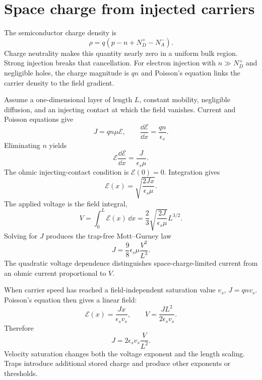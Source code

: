 \section{Space charge from injected carriers}

The semiconductor charge density is
\begin{equation}
  \rho=q(p-n+N_D^+-N_A^-).
  \label{eq:semiconductor-space-charge-density}
\end{equation}
Charge neutrality makes this quantity nearly zero in a uniform bulk region.
Strong injection breaks that cancellation.  For electron injection with
$n\gg N_D^+$ and negligible holes, the charge magnitude is $qn$ and Poisson's
equation links the carrier density to the field gradient.

Assume a one-dimensional layer of length $L$, constant mobility, negligible
diffusion, and an injecting contact at which the field vanishes.  Current and
Poisson equations give
\begin{equation}
  J=qn\mu\mathcal E,
  \qquad
  \frac{\dd\mathcal E}{\dd x}=\frac{qn}{\epsilon_s}.
  \label{eq:sclc-current-poisson}
\end{equation}
Eliminating $n$ yields
\begin{equation}
  \mathcal E\frac{\dd\mathcal E}{\dd x}
  =\frac{J}{\epsilon_s\mu}.
  \label{eq:sclc-field-equation}
\end{equation}
The ohmic injecting-contact condition is $\mathcal E(0)=0$.  Integration gives
\begin{equation}
  \mathcal E(x)
  =\sqrt{\frac{2Jx}{\epsilon_s\mu}}.
  \label{eq:mott-gurney-field-profile}
\end{equation}
The applied voltage is the field integral,
\begin{equation}
  V=\int_0^L\mathcal E(x)\,\dd x
  =\frac23\sqrt{\frac{2J}{\epsilon_s\mu}}L^{3/2}.
  \label{eq:mott-gurney-voltage-integral}
\end{equation}
Solving for $J$ produces the trap-free Mott--Gurney law
\begin{equation}
  \boxed{
  J=\frac98\epsilon_s\mu\frac{V^2}{L^3}.
  }
  \label{eq:mott-gurney-law}
\end{equation}
The quadratic voltage dependence distinguishes space-charge-limited current
from an ohmic current proportional to $V$.

When carrier speed has reached a field-independent saturation value $v_s$,
$J=qn v_s$.  Poisson's equation then gives a linear field:
\begin{equation}
  \mathcal E(x)=\frac{Jx}{\epsilon_s v_s},
  \qquad
  V=\frac{JL^2}{2\epsilon_s v_s}.
  \label{eq:saturated-sclc-field-profile}
\end{equation}
Therefore
\begin{equation}
  \boxed{
  J=2\epsilon_s v_s\frac{V}{L^2}.
  }
  \label{eq:saturated-sclc-law}
\end{equation}
Velocity saturation changes both the voltage exponent and the length scaling.
Traps introduce additional stored charge and produce other exponents or
thresholds.

